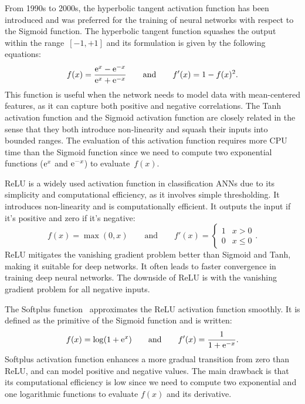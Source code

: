 \documentclass[algorithms,article,submit,pdftex,oneauthors]{Definitions/mdpi}
\DeclareRobustCommand{\e}[1]{{\rm e}^{#1}}
\begin{document}
From 1990s to 2000s, the hyperbolic tangent activation function has been introduced and was preferred for the training of neural networks with respect to the Sigmoid function.
The hyperbolic tangent function squashes the output within the range~$[-1,+1]$ and its formulation is given by the following equations:
\begin{equation}
f(x) = \frac{\e{x} - \e{-x}}{\e{x} + \e{-x}}\qquad \text{and}\qquad f'(x) = 1 - f(x)^2.\label{eq:act-tanh}
\end{equation}
This function is useful when the network needs to model data with mean-centered features, as it can capture both positive and negative correlations.
The Tanh activation function and the Sigmoid activation function are closely related in the sense that they both introduce non-linearity and squash their inputs into bounded ranges.
The evaluation of this activation function requires more CPU time than the Sigmoid function since we need to compute two exponential functions ($\e{x}$ and $\e{-x}$) to evaluate~$f(x)$.

ReLU is a widely used activation function in classification ANNs due to its simplicity and computational efficiency, as it involves simple thresholding.
It introduces non-linearity and is computationally efficient.
It outputs the input if it's positive and zero if it's negative:
\begin{equation}
f(x) = \max(0,x)\qquad \text{and}\qquad f'(x) =
\begin{cases}
1&x>0\\
0&x\le 0
\end{cases}.\label{eq:act-relu}
\end{equation}
ReLU mitigates the vanishing gradient problem better than Sigmoid and Tanh, making it suitable for deep networks.
It often leads to faster convergence in training deep neural networks.
The downside of ReLU is with the vanishing gradient problem for all negative inputs.

The Softplus function~\cite{Dugas-2000-ISO} approximates the ReLU activation function smoothly.
It is defined as the primitive of the Sigmoid function and is written:
\begin{equation}
f(x) = \log\left(1+\e{x}\right)\qquad \text{and}\qquad f'(x) = \frac{1}{1+\e{-x}}.\label{eq:act-softplus}
\end{equation}
Softplus activation function enhances a more gradual transition from zero than ReLU, and can model positive and negative values.
The main drawback is that its computational efficiency is low since we need to compute two exponential and one logarithmic functions to evaluate $f(x)$ and its derivative.
\end{document}
